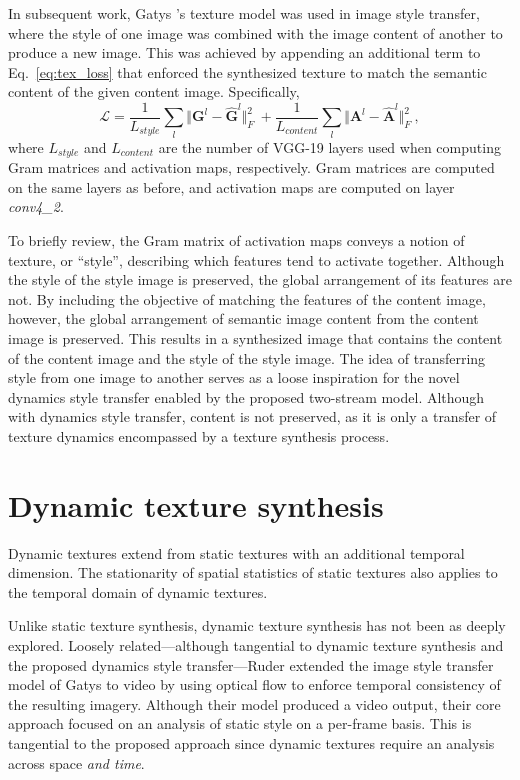 In subsequent work, Gatys \etal's \cite{gatys2016image} texture model was used in image style
transfer, where the style of one image was
combined with the image content of another to produce a new image.
This was achieved by appending an additional term to Eq.\ \ref{eq:tex_loss}
that enforced the synthesized texture to match the semantic content of the given content image. Specifically,
\begin{equation}
   \mathcal{L} = \frac{1}{L_{style}} \sum_{l} \Vert \mathbf{G}^l - \hat{\mathbf{G}}^l \Vert^2_F\ + \frac{1}{L_{content}} \sum_{l} \Vert \mathbf{A}^l - \hat{\mathbf{A}}^l \Vert^2_F\ ,
   \label{eq:styletransfer_loss}
\end{equation}
where $L_{style}$ and $L_{content}$ are the number of VGG-19 layers used when computing Gram matrices and activation maps, respectively. Gram matrices are computed on the same layers as before, and activation maps are computed on layer \emph{conv4\_2}.

To briefly review, the Gram matrix of activation maps conveys a notion of texture, or ``style'', describing which features tend to activate together. Although the style of the style image is preserved, the global arrangement of its features are not. By including the objective of matching the features of the content image, however, the global arrangement of semantic image content from the content image is preserved. This results in a synthesized image that contains the content of the content image and the style of the style image. The idea of transferring style from one image to another serves as a loose inspiration for the novel dynamics style transfer enabled by the proposed two-stream model. Although with dynamics style transfer, content is not preserved, as it is only a transfer of texture dynamics encompassed by a texture synthesis process.

\section{Dynamic texture synthesis}

Dynamic textures extend from static textures with an additional temporal dimension. The stationarity of spatial statistics of static textures also applies to the temporal domain of dynamic textures.

Unlike static texture synthesis, dynamic texture synthesis has not been as deeply explored. Loosely related---although tangential to dynamic texture synthesis and the proposed dynamics style transfer---Ruder \etal \cite{ruder2016} extended the image style transfer model of Gatys \etal \cite{gatys2016image} to video by using 
optical flow to enforce temporal consistency of the
resulting imagery. Although their model produced a video output, their core approach focused on an analysis of static style on a per-frame basis. This is tangential to the proposed approach since dynamic textures require an analysis across space \emph{and time}.

